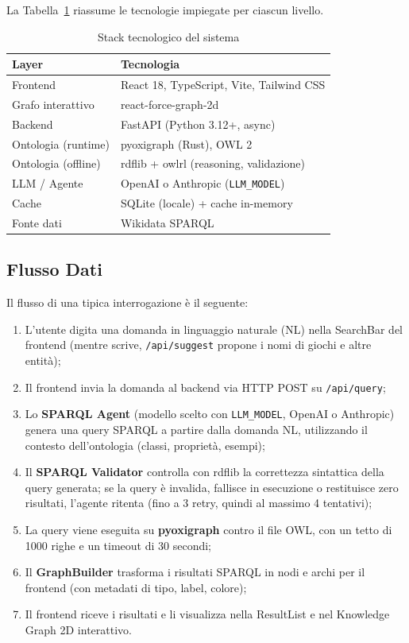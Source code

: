 La Tabella~\ref{tab:stack} riassume le tecnologie impiegate per ciascun livello.

\begin{table}[h]
\centering
\caption{Stack tecnologico del sistema}
\label{tab:stack}
\begin{tabular}{ll}
\toprule
\textbf{Layer}      & \textbf{Tecnologia}                         \\
\midrule
Frontend            & React 18, TypeScript, Vite, Tailwind CSS    \\
Grafo interattivo   & react-force-graph-2d                        \\
Backend             & FastAPI (Python 3.12+, async)               \\
Ontologia (runtime) & pyoxigraph (Rust), OWL 2                    \\
Ontologia (offline) & rdflib + owlrl (reasoning, validazione)     \\
LLM / Agente        & OpenAI o Anthropic (\texttt{LLM\_MODEL})      \\
Cache               & SQLite (locale) + cache in-memory            \\
Fonte dati          & Wikidata SPARQL                             \\
\bottomrule
\end{tabular}
\end{table}

\subsection{Flusso Dati}

Il flusso di una tipica interrogazione \`e il seguente:
\begin{enumerate}[nosep]
  \item L'utente digita una domanda in linguaggio naturale (NL) nella SearchBar del frontend (mentre scrive, \texttt{/api/suggest} propone i nomi di giochi e altre entit\`a);
  \item Il frontend invia la domanda al backend via HTTP POST su \texttt{/api/query};
  \item Lo \textbf{SPARQL Agent} (modello scelto con \texttt{LLM\_MODEL}, OpenAI o Anthropic) genera una query SPARQL a partire dalla domanda NL, utilizzando il contesto dell'ontologia (classi, propriet\`a, esempi);
  \item Il \textbf{SPARQL Validator} controlla con rdflib la correttezza sintattica della query generata; se la query \`e invalida, fallisce in esecuzione o restituisce zero risultati, l'agente ritenta (fino a 3 retry, quindi al massimo 4 tentativi);
  \item La query viene eseguita su \textbf{pyoxigraph} contro il file OWL, con un tetto di 1000 righe e un timeout di 30 secondi;
  \item Il \textbf{GraphBuilder} trasforma i risultati SPARQL in nodi e archi per il frontend (con metadati di tipo, label, colore);
  \item Il frontend riceve i risultati e li visualizza nella ResultList e nel Knowledge Graph 2D interattivo.
\end{enumerate}

